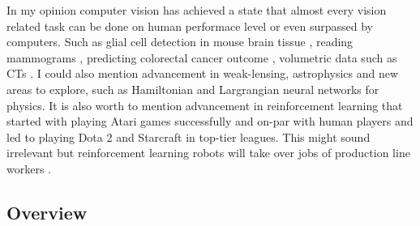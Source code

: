 \documentclass[a4paper,12pt]{article}
\begin{document}
\vspace{4mm}

\par In my opinion computer vision has achieved a state that almost every vision related task can be done on human performace level or even surpassed by computers. Such as glial cell detection in mouse brain tissue \cite{suleymanova2018deep}, reading mammograms  \cite{ribli2018detecting}, 
predicting colorectal cancer outcome \cite{skrede2020deep}, volumetric data such as CTs \cite{cciccek20163d}. I could also mention advancement in weak-lensing, astrophysics \cite{ribli2019improved} and new areas to explore, such as Hamiltonian \cite{greydanus2019hamiltonian} and Largrangian \cite{cranmer2020lagrangian} neural networks for physics. It is also worth to mention advancement in reinforcement learning that started with playing Atari games \cite{mnih2013playing} successfully and on-par with human players and led to playing Dota 2 and Starcraft \cite{alphastarblog} in top-tier leagues. This might sound irrelevant but reinforcement learning robots will take over jobs of production line workers \cite{satariano_metz_2020}. 

\subsection{Overview}

\newpage



\end{document}
